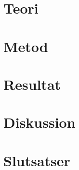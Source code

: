 
\section{Teori}
\label{sec:theory-person}


\section{Metod}
\label{sec:method-person}


\section{Resultat}
\label{sec:results-person}


\section{Diskussion}
\label{sec:discussion-person}


\section{Slutsatser}
\label{sec:conclusions-person}


